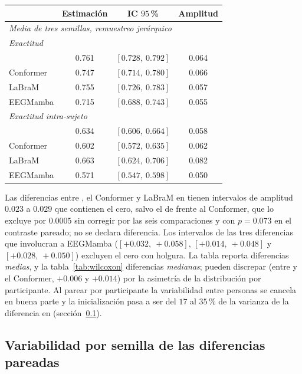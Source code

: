 \begin{table}[htbp]
\medskip
\small
\begin{tabular}{lccc}
\toprule
 & \textbf{Estimación} & \textbf{IC $95$\,\%} & \textbf{Amplitud} \\
\midrule
\multicolumn{4}{l}{\textit{Media de tres semillas, remuestreo jerárquico}} \\
\multicolumn{4}{l}{\textit{Exactitud \loso{}}} \\
\eegnet{}  & 0.761 & $[0.728,\ 0.792]$ & 0.064 \\
Conformer  & 0.747 & $[0.714,\ 0.780]$ & 0.066 \\
LaBraM     & 0.755 & $[0.726,\ 0.783]$ & 0.057 \\
EEGMamba   & 0.715 & $[0.688,\ 0.743]$ & 0.055 \\
\midrule
\multicolumn{4}{l}{\textit{Exactitud intra-sujeto}} \\
\eegnet{}  & 0.634 & $[0.606,\ 0.664]$ & 0.058 \\
Conformer  & 0.602 & $[0.572,\ 0.635]$ & 0.062 \\
LaBraM     & 0.663 & $[0.624,\ 0.706]$ & 0.082 \\
EEGMamba   & 0.571 & $[0.547,\ 0.598]$ & 0.050 \\
\bottomrule
\end{tabular}
\end{table}

Las diferencias entre \eegnet{}, el Conformer y LaBraM en \loso{} tienen intervalos de amplitud
$0.023$ a $0.029$ que contienen el cero, salvo el de \eegnet{} frente al Conformer, que lo excluye por
$0.0005$ sin corregir por las seis comparaciones y con $p = 0.073$ en el contraste pareado; no se
declara diferencia. Los intervalos de las tres diferencias que involucran a EEGMamba
($[+0.032,\ +0.058]$, $[+0.014,\ +0.048]$ y $[+0.028,\ +0.050]$) excluyen el cero con holgura. La tabla
reporta diferencias \emph{medias}, y la tabla~\ref{tab:wilcoxon} diferencias \emph{medianas}; pueden
discrepar (entre \eegnet{} y el Conformer, $+0.006$ y $+0.014$) por la asimetría de la distribución por
participante. Al parear por participante la variabilidad entre personas se cancela en buena parte y la
inicialización pasa a ser del $17$ al $35$\,\% de la varianza de la diferencia en \loso{}
(sección~\ref{sec:variabilidad-semillas}).

\subsection{Variabilidad por semilla de las diferencias pareadas}
\label{sec:variabilidad-semillas}

